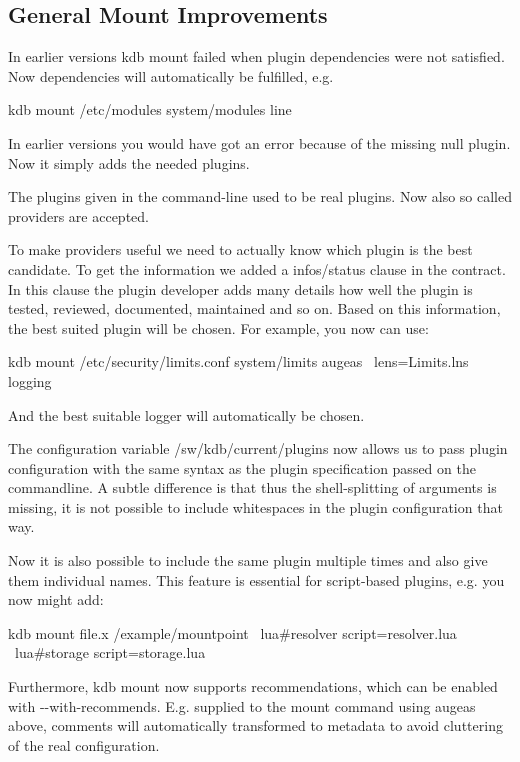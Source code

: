 \subsection*{General Mount Improvements}

In earlier versions {\ttfamily kdb mount} failed when plugin dependencies were not satisfied. Now dependencies will automatically be fulfilled, e.\+g. \begin{DoxyVerb}kdb mount /etc/modules system/modules line
\end{DoxyVerb}


In earlier versions you would have got an error because of the missing {\ttfamily null} plugin. Now it simply adds the needed plugins.

The plugins given in the command-\/line used to be real plugins. Now also so called providers are accepted.

To make providers useful we need to actually know which plugin is the best candidate. To get the information we added a {\ttfamily infos/status} clause in the contract. In this clause the plugin developer adds many details how well the plugin is tested, reviewed, documented, maintained and so on. Based on this information, the best suited plugin will be chosen. For example, you now can use\+: \begin{DoxyVerb}kdb mount /etc/security/limits.conf system/limits augeas \
    lens=Limits.lns logging
\end{DoxyVerb}


And the best suitable logger will automatically be chosen.

The configuration variable {\ttfamily /sw/kdb/current/plugins} now allows us to pass plugin configuration with the same syntax as the plugin specification passed on the commandline. A subtle difference is that thus the shell-\/splitting of arguments is missing, it is not possible to include whitespaces in the plugin configuration that way.

Now it is also possible to include the same plugin multiple times and also give them individual names. This feature is essential for script-\/based plugins, e.\+g. you now might add\+: \begin{DoxyVerb}kdb mount file.x /example/mountpoint \
    lua#resolver script=resolver.lua \
    lua#storage script=storage.lua
\end{DoxyVerb}


Furthermore, {\ttfamily kdb mount} now supports recommendations, which can be enabled with {\ttfamily -\/-\/with-\/recommends}. E.\+g. supplied to the mount command using augeas above, comments will automatically transformed to metadata to avoid cluttering of the real configuration.

